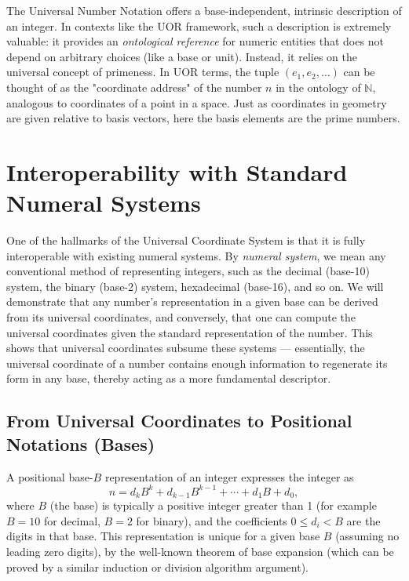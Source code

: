 \documentclass[11pt]{article}
\begin{document}
The Universal Number Notation offers a base-independent, intrinsic description of an integer. In contexts like the UOR framework, such a description is extremely valuable: it provides an \emph{ontological reference} for numeric entities that does not depend on arbitrary choices (like a base or unit). Instead, it relies on the universal concept of primeness. In UOR terms, the tuple $(e_1,e_2,\dots)$ can be thought of as the "coordinate address" of the number $n$ in the ontology of $\mathbb{N}$, analogous to coordinates of a point in a space. Just as coordinates in geometry are given relative to basis vectors, here the basis elements are the prime numbers.

\section{Interoperability with Standard Numeral Systems}

One of the hallmarks of the Universal Coordinate System is that it is fully interoperable with existing numeral systems. By \emph{numeral system}, we mean any conventional method of representing integers, such as the decimal (base-10) system, the binary (base-2) system, hexadecimal (base-16), and so on. We will demonstrate that any number's representation in a given base can be derived from its universal coordinates, and conversely, that one can compute the universal coordinates given the standard representation of the number. This shows that universal coordinates subsume these systems --- essentially, the universal coordinate of a number contains enough information to regenerate its form in any base, thereby acting as a more fundamental descriptor.

\subsection*{From Universal Coordinates to Positional Notations (Bases)}

A positional base-$B$ representation of an integer expresses the integer as 
\[ n = d_k B^k + d_{k-1} B^{k-1} + \cdots + d_1 B + d_0, \] 
where $B$ (the base) is typically a positive integer greater than 1 (for example $B=10$ for decimal, $B=2$ for binary), and the coefficients $0 \le d_i < B$ are the digits in that base. This representation is unique for a given base $B$ (assuming no leading zero digits), by the well-known theorem of base expansion (which can be proved by a similar induction or division algorithm argument).
\end{document}
